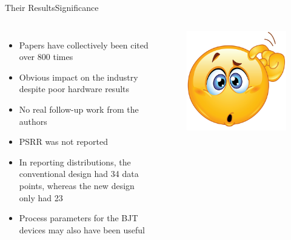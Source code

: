 \documentclass[aspectratio=1610]{beamer} %
\begin{document}
\begin{frame}{Their Results}{Significance}

    \begin{columns}[c]
        \begin{itemize}
            \item Papers have collectively been cited over 800 times
            \item Obvious impact on the industry despite poor hardware results
            \item No real follow-up work from the authors
            \item PSRR was not reported
            \item In reporting distributions, the conventional design had 34 data points, whereas the new design only had 23
            \item Process parameters for the BJT devices may also have been useful
        \end{itemize}
    
        \begin{figure}
            \includegraphics[height=0.4\columnwidth]{hmm.png}            
        \end{figure}
    \end{columns}
\end{frame}
\end{document}
